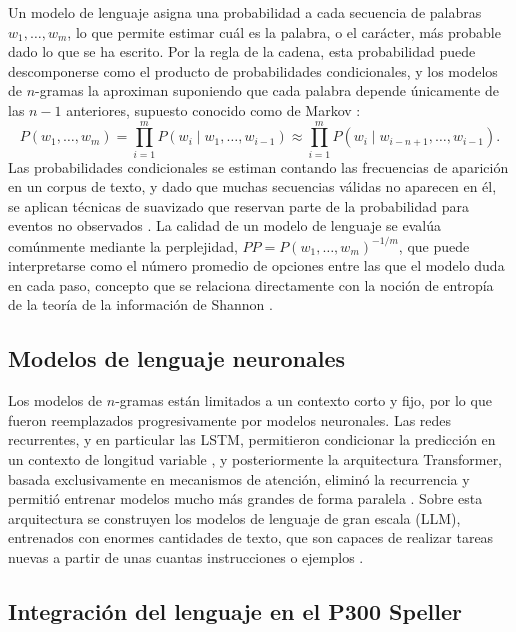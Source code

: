 Un modelo de lenguaje asigna una probabilidad a cada secuencia de palabras $w_1, \dots, w_m$, lo
que permite estimar cuál es la palabra, o el carácter, más probable dado lo que se ha escrito. Por
la regla de la cadena, esta probabilidad puede descomponerse como el producto de probabilidades
condicionales, y los modelos de $n$-gramas la aproximan suponiendo que cada palabra depende
únicamente de las $n-1$ anteriores, supuesto conocido como de Markov \cite{jurafsky2025}:
\begin{equation}
P(w_1,\dots,w_m) = \prod_{i=1}^{m} P(w_i \mid w_1,\dots,w_{i-1}) \approx \prod_{i=1}^{m} P(w_i \mid w_{i-n+1},\dots,w_{i-1}).
\label{eq:ngramas}
\end{equation}
Las probabilidades condicionales se estiman contando las frecuencias de aparición en un corpus de
texto, y dado que muchas secuencias válidas no aparecen en él, se aplican técnicas de suavizado que
reservan parte de la probabilidad para eventos no observados \cite{jurafsky2025}. La calidad de un
modelo de lenguaje se evalúa comúnmente mediante la perplejidad, $PP = P(w_1,\dots,w_m)^{-1/m}$,
que puede interpretarse como el número promedio de opciones entre las que el modelo duda en cada
paso, concepto que se relaciona directamente con la noción de entropía de la teoría de la
información de Shannon \cite{shannon1948,jurafsky2025}.

\subsection{Modelos de lenguaje neuronales}

Los modelos de $n$-gramas están limitados a un contexto corto y fijo, por lo que fueron
reemplazados progresivamente por modelos neuronales. Las redes recurrentes, y en particular las
LSTM, permitieron condicionar la predicción en un contexto de longitud variable
\cite{hochreiter1997,jurafsky2025}, y posteriormente la arquitectura Transformer, basada
exclusivamente en mecanismos de atención, eliminó la recurrencia y permitió entrenar modelos
mucho más grandes de forma paralela \cite{vaswani2017}. Sobre esta arquitectura se construyen los
modelos de lenguaje de gran escala (LLM), entrenados con enormes cantidades de texto, que son
capaces de realizar tareas nuevas a partir de unas cuantas instrucciones o ejemplos
\cite{brown2020}.

\subsection{Integración del lenguaje en el P300 Speller}

